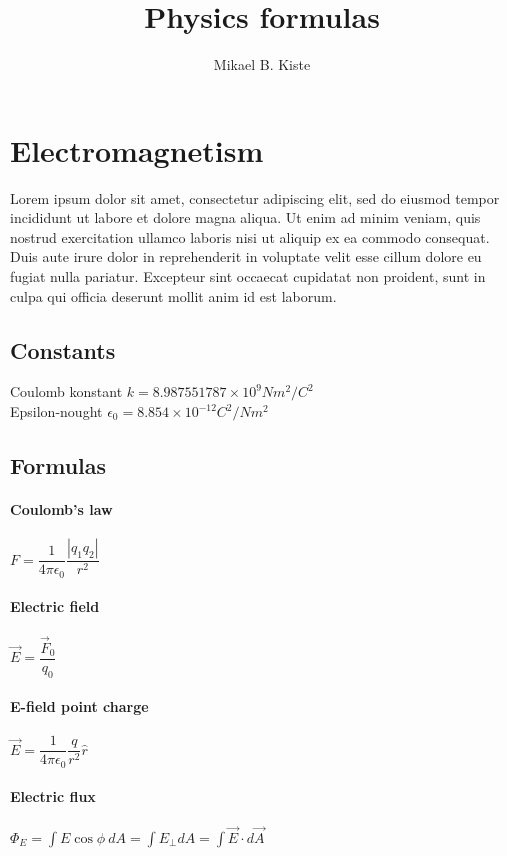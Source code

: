 \documentclass[10pt,a4paper]{article}
\author{Mikael B. Kiste}
\title{Physics formulas}
\begin{document}
	\maketitle
	\section{Electromagnetism}
	Lorem ipsum dolor sit amet, consectetur adipiscing elit, sed do eiusmod tempor incididunt ut labore et dolore magna aliqua. Ut enim ad minim veniam, quis nostrud exercitation ullamco laboris nisi ut aliquip ex ea commodo consequat. Duis aute irure dolor in reprehenderit in voluptate velit esse cillum dolore eu fugiat nulla pariatur. Excepteur sint occaecat cupidatat non proident, sunt in culpa qui officia deserunt mollit anim id est laborum.
	\subsection{Constants}
		Coulomb konstant $k = 8.987551787\times10^{9} Nm^{2}/C^{2}$ \\Epsilon-nought $\epsilon_0 = 8.854\times10^{-12}C^{2}/Nm^{2}$
	\subsection{Formulas}
		\paragraph{Coulomb's law}
			$F=\dfrac{1}{4\pi\epsilon_{0}}\dfrac{|q_{1}q_{2}|}{r^{2}}$
		\paragraph{Electric field}
			$\vec{E}=\dfrac{\vec{F}_0}{q_0}$
		\paragraph{E-field point charge}
			$\vec{E}=\dfrac{1}{4\pi\epsilon_0}\dfrac{q}{r^2}\hat{r}$
		\paragraph{Electric flux}
			$\Phi_E=\int E\cos\phi\:dA=\int E_\perp dA=\int \vec{E}\cdot d\vec{A}$
\end{document}
